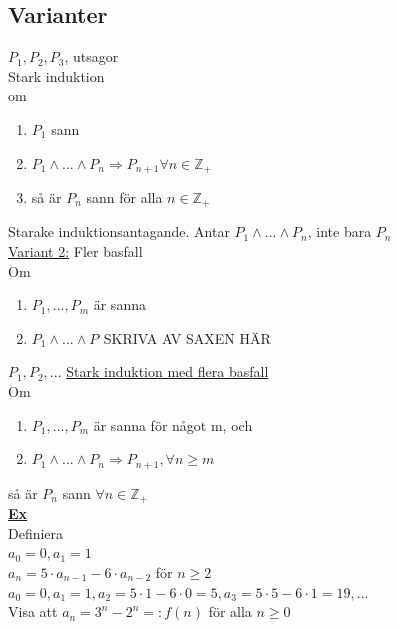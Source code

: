 \documentclass{article}
\begin{document}
        \subsection{Varianter}
            $P_{1}, P_{2}, P_{3}$, utsagor\\
            Stark induktion\\
            \indent om
            \begin{enumerate}
                \item $P_{1}$ sann
                \item $P_{1}\wedge ...\wedge P_{n}\Rightarrow P_{n+1} \forall n\in \mathbb{Z}_{+}$
                \item så är $P_{n}$ sann för alla $n\in \mathbb{Z}_{+}$
            \end{enumerate}
            Starake induktionsantagande. Antar $P_{1}\wedge ... \wedge P_{n}$, inte bara $P_{n}$\\
            \underline{Variant 2:} Fler basfall\\
            \indent Om
            \begin{enumerate}
                \item $P_{1}, ..., P_{m}$ är sanna
                \item $P_{1}\wedge ...\wedge P_{} $ SKRIVA AV SAXEN HÄR
            \end{enumerate}
            $P_{1}, P_{2}, ...$ \underline{Stark induktion med flera basfall}\\
            \indent Om 
            \begin{enumerate}
                \item $P_{1}, ..., P_{m}$ är sanna för något m, och
                \item $P_{1} \wedge ... \wedge P_{n} \Rightarrow P_{n+1}, \forall n\geq m$
            \end{enumerate}
            \indent så är $P_{n}$ sann $\forall n\in \mathbb{Z}_{+}$\\
            \underline{\textbf{Ex}}\\
            Definiera\\
            $a_{0}=0, a_{1}=1$\\
            $a_{n}=5\cdot a_{n-1}-6\cdot a_{n-2}$ för $n\geq 2$\\
            $a_{0}=0, a_{1}=1, a_{2}=5\cdot 1-6\cdot 0=5, a_{3}=5\cdot 5-6\cdot 1=19, ...$\\
            Visa att $a_{n}=3^{n}-2^{n}= : f(n)$ för alla $n\geq 0$\\
\end{document}
